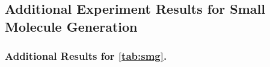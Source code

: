 \subsection{Additional Experiment Results for Small Molecule Generation}
\subsubsection{Additional Results for \cref{tab:smg}.}


\begin{table}[ht]
    \centering
    \setlength{\tabcolsep}{2pt} %
    \caption{Relative performance improvement of \xtsampling compared to DG and TFG-Flow (average over different target values). }
    \label{tab:smg_rel}
\end{table}




